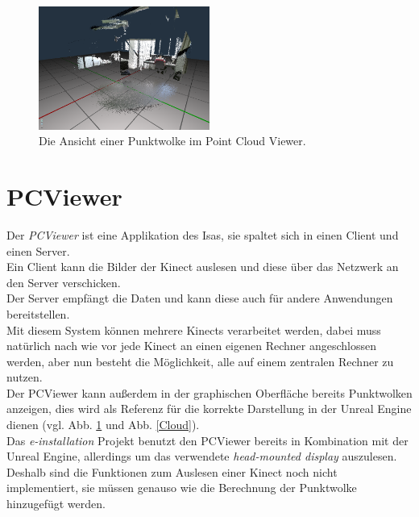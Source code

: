\documentclass[a4paper]{IEEEtran}
\begin{document}
	\begin{figure}[!h]
    	\centering
		\includegraphics[width=0.5\textwidth]{img/CloudPCViewer}
	    \caption{Die Ansicht einer Punktwolke im Point Cloud Viewer.}
    	\label{CloudPCViewer}
	\end{figure}

\section{PCViewer}
	Der {\textit{PCViewer}} ist eine Applikation des Isas, sie spaltet sich in einen Client und einen Server. \\
	Ein Client kann die Bilder der Kinect auslesen und diese über das Netzwerk an den Server verschicken. \\
	Der Server empfängt die Daten und kann diese auch für andere Anwendungen bereitstellen.\\
	Mit diesem System können mehrere Kinects verarbeitet werden, dabei muss natürlich nach wie vor jede Kinect an einen eigenen Rechner angeschlossen werden, aber nun besteht die Möglichkeit, alle auf einem zentralen Rechner zu nutzen.\\
	Der PCViewer kann außerdem in der graphischen Oberfläche bereits Punktwolken anzeigen, dies wird als Referenz für die korrekte Darstellung in der Unreal Engine dienen (vgl. Abb. \ref{CloudPCViewer} und Abb. \ref{Cloud}). \\
	Das {\textit{e-installation}} Projekt benutzt den PCViewer bereits in Kombination mit der Unreal Engine, allerdings um das verwendete {\textit{head-mounted display}} auszulesen. \\
	Deshalb sind die Funktionen zum Auslesen einer Kinect noch nicht implementiert, sie müssen genauso wie die Berechnung der Punktwolke hinzugefügt werden. \\[0.5cm]
	
\end{document}
